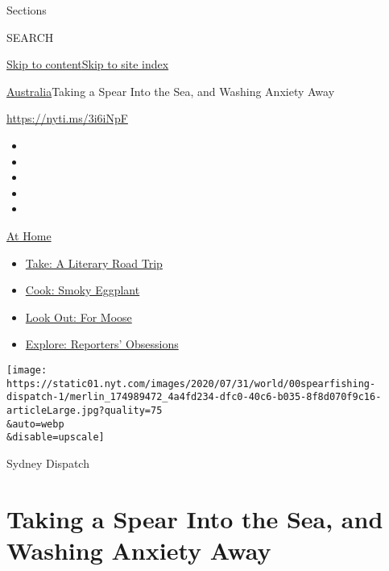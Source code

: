Sections

SEARCH

\protect\hyperlink{site-content}{Skip to
content}\protect\hyperlink{site-index}{Skip to site index}

\href{/section/world/australia}{Australia}\textbar{}Taking a Spear Into
the Sea, and Washing Anxiety Away

\url{https://nyti.ms/3i6iNpF}

\begin{itemize}
\item
\item
\item
\item
\item
\end{itemize}

\href{https://www.nytimes.com/spotlight/at-home?action=click\&pgtype=Article\&state=default\&region=TOP_BANNER\&context=at_home_menu}{At
Home}

\begin{itemize}
\tightlist
\item
  \href{https://www.nytimes.com/2020/07/28/books/time-for-a-literary-road-trip.html?action=click\&pgtype=Article\&state=default\&region=TOP_BANNER\&context=at_home_menu}{Take:
  A Literary Road Trip}
\item
  \href{https://www.nytimes.com/2020/07/29/magazine/bored-with-your-home-cooking-some-smoky-eggplant-will-fix-that.html?action=click\&pgtype=Article\&state=default\&region=TOP_BANNER\&context=at_home_menu}{Cook:
  Smoky Eggplant}
\item
  \href{https://www.nytimes.com/2020/07/27/travel/moose-michigan-isle-royale.html?action=click\&pgtype=Article\&state=default\&region=TOP_BANNER\&context=at_home_menu}{Look
  Out: For Moose}
\item
  \href{https://www.nytimes.com/interactive/2020/at-home/even-more-reporters-editors-diaries-lists-recommendations.html?action=click\&pgtype=Article\&state=default\&region=TOP_BANNER\&context=at_home_menu}{Explore:
  Reporters' Obsessions}
\end{itemize}

\texttt{[image: https://static01.nyt.com/images/2020/07/31/world/00spearfishing-dispatch-1/merlin\_174989472\_4a4fd234-dfc0-40c6-b035-8f8d070f9c16-articleLarge.jpg?quality=75\\\&auto=webp\\\&disable=upscale]}

Sydney Dispatch

\hypertarget{taking-a-spear-into-the-sea-and-washing-anxiety-away}{%
\section{Taking a Spear Into the Sea, and Washing Anxiety
Away}\label{taking-a-spear-into-the-sea-and-washing-anxiety-away}}

